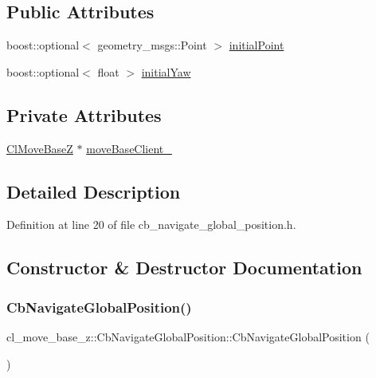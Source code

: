 \subsection*{Public Attributes}
\begin{DoxyCompactItemize}
\item 
boost\+::optional$<$ geometry\+\_\+msgs\+::\+Point $>$ \hyperlink{classcl__move__base__z_1_1CbNavigateGlobalPosition_afc5b0337f06dc4c51026e0c0646b8645}{initial\+Point}
\item 
boost\+::optional$<$ float $>$ \hyperlink{classcl__move__base__z_1_1CbNavigateGlobalPosition_a09f1cf00473ae1f90b974f49a1c31086}{initial\+Yaw}
\end{DoxyCompactItemize}
\subsection*{Private Attributes}
\begin{DoxyCompactItemize}
\item 
\hyperlink{classcl__move__base__z_1_1ClMoveBaseZ}{Cl\+Move\+BaseZ} $\ast$ \hyperlink{classcl__move__base__z_1_1CbNavigateGlobalPosition_a460d6b43834cb52baa94d22cd3a6fd2b}{move\+Base\+Client\+\_\+}
\end{DoxyCompactItemize}


\subsection{Detailed Description}


Definition at line 20 of file cb\+\_\+navigate\+\_\+global\+\_\+position.\+h.



\subsection{Constructor \& Destructor Documentation}
\mbox{\label{classcl__move__base__z_1_1CbNavigateGlobalPosition_aec75d2481b2057bbbdad9513c4dc08cd}} 
\subsubsection{\texorpdfstring{Cb\+Navigate\+Global\+Position()}{CbNavigateGlobalPosition()}\hspace{0.1cm}{\footnotesize\ttfamily [1/2]}}
{\footnotesize\ttfamily cl\+\_\+move\+\_\+base\+\_\+z\+::\+Cb\+Navigate\+Global\+Position\+::\+Cb\+Navigate\+Global\+Position (\begin{DoxyParamCaption}{ }\end{DoxyParamCaption})}



